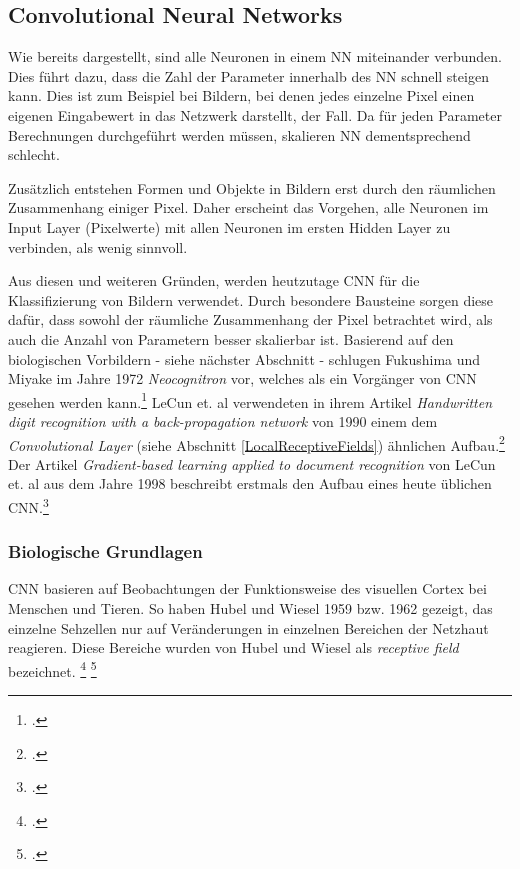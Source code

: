 \subsection{Convolutional Neural Networks} \label{sec:CNN}
Wie bereits dargestellt, sind alle Neuronen in einem \ac{NN} miteinander verbunden. Dies führt dazu, dass die Zahl der Parameter innerhalb des \ac{NN} schnell steigen kann. Dies ist zum Beispiel bei Bildern, bei denen jedes einzelne Pixel einen eigenen Eingabewert in das Netzwerk darstellt, der Fall. Da für jeden Parameter Berechnungen durchgeführt werden müssen, skalieren \ac{NN} dementsprechend schlecht.

Zusätzlich entstehen Formen und Objekte in Bildern erst durch den räumlichen Zusammenhang einiger Pixel. Daher erscheint das Vorgehen, alle Neuronen im Input Layer (Pixelwerte) mit allen Neuronen im ersten Hidden Layer zu verbinden, als wenig sinnvoll.

Aus diesen und weiteren Gründen, werden heutzutage \ac{CNN} für die Klassifizierung von Bildern verwendet. Durch besondere Bausteine sorgen diese dafür, dass sowohl der räumliche Zusammenhang der Pixel betrachtet wird, als auch die Anzahl von Parametern besser skalierbar ist. Basierend auf den biologischen Vorbildern - siehe nächster Abschnitt - schlugen Fukushima und Miyake im Jahre 1972 \textit{Neocognitron} vor, welches als ein Vorgänger von \ac{CNN} gesehen werden kann.\footcite[Vgl.][S. 267–285]{fukushima1982neocognitron} LeCun et. al verwendeten in ihrem Artikel \textit{Handwritten digit recognition with a back-propagation network} von 1990 einem dem \textit{Convolutional Layer} (siehe Abschnitt \ref{LocalReceptiveFields}) ähnlichen Aufbau.\footcite[Vgl.][S. 396–404]{lecun1990handwritten} Der Artikel \textit{Gradient-based learning applied to document recognition} von LeCun et. al aus dem Jahre 1998 beschreibt erstmals den Aufbau eines heute üblichen \ac{CNN}.\footcite[Vgl.][S. 2278–2324]{lecunGradientbasedLearningApplied1998}

\subsubsection{Biologische Grundlagen}
\ac{CNN} basieren auf Beobachtungen der Funktionsweise des visuellen Cortex bei Menschen und Tieren. So haben Hubel und Wiesel 1959 bzw. 1962 gezeigt, das einzelne Sehzellen nur auf Veränderungen in einzelnen Bereichen der Netzhaut reagieren. Diese Bereiche wurden von Hubel und Wiesel als \textit{receptive field} bezeichnet. \footcite[Vgl. ][S. 574-591]{hubelReceptiveFieldsSingle1959} \footcite[Vgl. ][S. 106-154]{hubelReceptiveFieldsBinocular1962}


